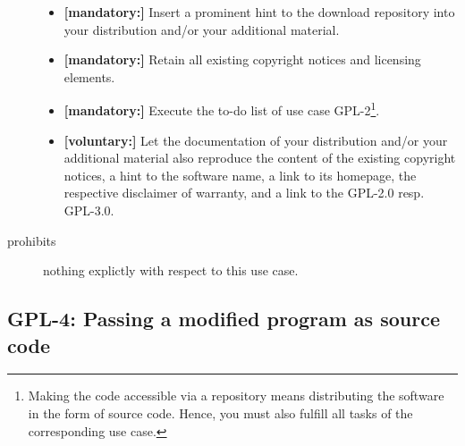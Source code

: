 \begin{description}
\begin{itemize}
  \item \textbf{[mandatory:]} Insert a prominent hint to the download repository
  into your distribution and/or your additional material.

  \item \textbf{[mandatory:]} Retain all existing copyright notices and
  licensing elements.
    
  \item \textbf{[mandatory:]} Execute the to-do list of use case GPL-2\footnote{
  Making the code accessible via a repository means distributing the software in
  the form of source code. Hence, you must also fulfill all tasks of the
  corresponding use case.}.

  \item \textbf{[voluntary:]} Let the documentation of your distribution and/or
  your additional material also reproduce the content of the existing
  copyright notices, a hint to the software name, a link to its homepage,
  the respective disclaimer of warranty, and a link to the GPL-2.0 resp.
  GPL-3.0.

\end{itemize}

\item[prohibits] nothing explictly with respect to this use case.

\end{description}

\subsection{GPL-4: Passing a modified program as source code}
\label{OSUC-04S-GPL} 

